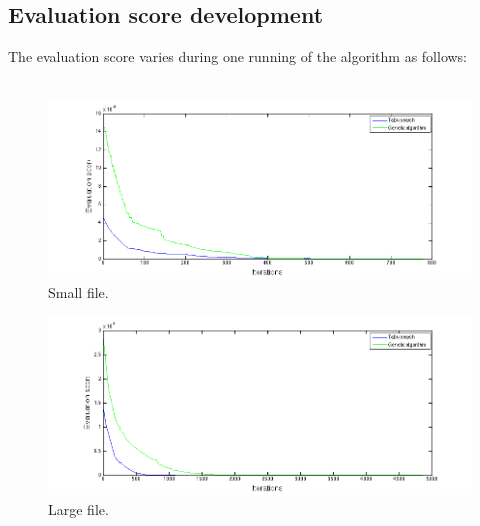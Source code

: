 \documentclass[titlepage,a4paper]{article}
\begin{document}
\subsection{Evaluation score development}
The evaluation score varies during one running of the algorithm as follows: \\\\
\begin{figure}[H]
  \centerline{\includegraphics[scale=0.5]{../results/plot_small.png}}
  \caption{Small file.}
  \label{plot_small}
\end{figure}

\begin{figure}[H]
  \centerline{\includegraphics[scale=0.5]{../results/plot_medium.png}}
  \caption{Large file.}
  \label{plot_large}
\end{figure}
\end{document}
